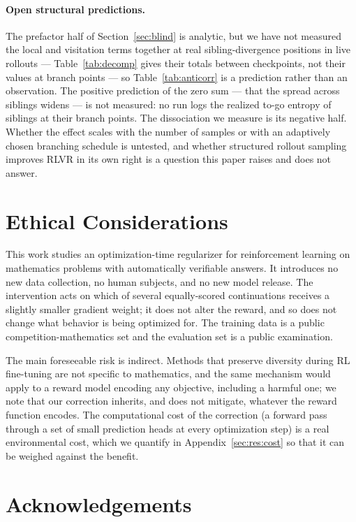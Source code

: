 \documentclass[11pt]{article}
\begin{document}
\paragraph{Open structural predictions.} The prefactor half of
Section~\ref{sec:blind} is analytic, but we have not measured the local and visitation
terms together at real sibling-divergence positions in live rollouts --- Table~\ref{tab:decomp}
gives their totals between checkpoints, not their values at branch points --- so
Table~\ref{tab:anticorr} is a prediction rather than an observation. The positive
prediction of the zero sum --- that the spread across siblings widens --- is not
measured: no run logs the realized to-go entropy of siblings at their branch points.
The dissociation we measure is its negative half. Whether the effect scales with the number of samples or with an
adaptively chosen branching schedule \citep{cao2026treeadv,khomich2026epig} is untested, and whether structured rollout
sampling improves RLVR in its own right is a question this paper raises and does not
answer.

\section*{Ethical Considerations}

This work studies an optimization-time regularizer for reinforcement learning on
mathematics problems with automatically verifiable answers. It introduces no new
data collection, no human subjects, and no new model release. The intervention acts
on which of several equally-scored continuations receives a slightly smaller
gradient weight; it does not alter the reward, and so does not change what behavior
is being optimized for. The training data is a public competition-mathematics set
and the evaluation set is a public examination.

The main foreseeable risk is indirect. Methods that preserve diversity during RL
fine-tuning are not specific to mathematics, and the same mechanism would apply to a
reward model encoding any objective, including a harmful one; we note that our
correction inherits, and does not mitigate, whatever the reward function encodes. The
computational cost of the correction (a forward pass through a set of small prediction
heads at every optimization step) is a real environmental cost, which we quantify in
Appendix~\ref{sec:res:cost} so that it can be weighed against the benefit.

\section*{Acknowledgements}
\end{document}
